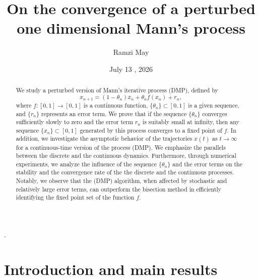 \documentclass[11pt]{amsart}%
\theoremstyle{plain}
\numberwithin{equation}{section}
\begin{document}
\title[On the convergence of a perturbed one dimensional Mann's process]
{On the convergence of a perturbed one dimensional Mann's process}%
\author{Ramzi May}%
\address{Department of Mathematics and Statistics, College of Science, King Faisal University, Al-Ahsa, Kingdom of Saudi Arabia}
.
\vskip 0.2cm
\date{ July 13 , 2026}

\begin{abstract} We study a perturbed version of Mann's iterative process (DMP), defined by
\[
x_{n+1} = (1 - \theta_n)x_n + \theta_n f(x_n) + r_n,
\]
where $f: [0,1] \to [0,1]$ is a continuous function, $\{\theta_n\} \subset [0,1]$ is a given sequence, and $\{r_n\} $ represents an error term. We prove that if the sequence $\{\theta_n\} $ converges sufficiently slowly to zero and the error term $ r_n $ is suitably small at infinity, then any sequence $\{x_n\} \subset [0,1] $ generated by this process converges to a fixed point of  $f$. In addition, we investigate the asymptotic behavior of the trajectories $ x(t) $ as $ t \to \infty$ for a continuous-time version of the process (DMP). We emphasize the parallels between the discrete and the continuous dynamics. Furthermore, through numerical experiments, we analyze the influence of the sequence $\{\theta_n\} $ and the error terms on the stability and the convergence rate of the the discrete and the continuous processes. Notably, we observe that the (DMP) algorithm, when affected by stochastic and relatively large error terms, can outperform the bisection method in efficiently identifying the fixed point set of the function  $f$.\end{abstract}
\maketitle

\section{Introduction and main results}
\end{document}
